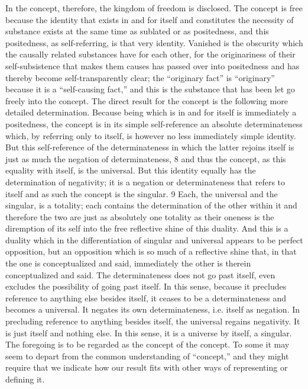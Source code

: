 In the concept, therefore, the kingdom of freedom is disclosed.
The concept is free because the identity that exists in and for itself
and constitutes the necessity of substance exists
at the same time as sublated or as positedness,
and this positedness, as self-referring, is that very identity.
Vanished is the obscurity which the causally related substances have for each other, for the
originariness of their self-subsistence that makes them causes has passed
over into positedness and has thereby become self-transparently clear;
the “originary fact” is “originary” because it is a “self-causing fact,”
and this is the substance that has been let go freely into the concept.
The direct result for the concept is the following more detailed determination.
Because being which is in and for itself is immediately a positedness,
the concept is in its simple self-reference an absolute determinateness which,
by referring only to itself, is however no less immediately simple identity.
But this self-reference of the determinateness in which the latter rejoins itself
is just as much the negation of determinateness, 8 and thus the concept, as
this equality with itself, is the universal. But this identity equally has the
determination of negativity; it is a negation or determinateness that refers
to itself and as such the concept is the singular. 9 Each, the universal and the
singular, is a totality; each contains the determination of the other within
it and therefore the two are just as absolutely one totality as their oneness
is the diremption of its self into the free reflective shine of this duality.
And this is a duality which in the differentiation of singular and universal
appears to be perfect opposition, but an opposition which is so much of a
reflective shine that, in that the one is conceptualized and said, immediately
the other is therein conceptualized and said.
The determinateness does not go past itself,
even excludes the possibility of going past itself.
In this sense, because it precludes reference to anything else besides itself,
it ceases to be a determinateness
and becomes a universal. It negates its own determinateness, i.e. itself as negation.
In precluding reference to anything besides itself,
the universal regains negativity.
It is just itself and nothing else.
In this sense, it is a universe by itself, a singular.
The foregoing is to be regarded as the concept of the concept.
To some it
may seem to depart from the common understanding of “concept,” and
they might require that we indicate how our result fits with other ways of
representing or defining it.

